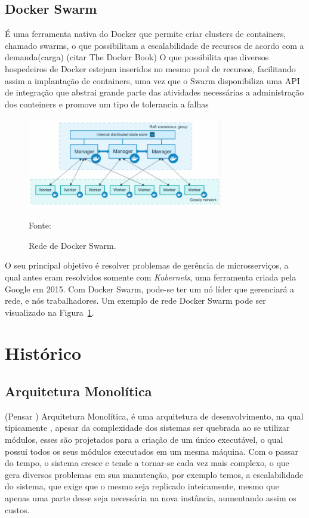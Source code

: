 \subsection{Docker Swarm}

É uma ferramenta nativa do Docker que permite criar clusters de containers, chamado swarms, o que possibilitam a escalabilidade de recursos de acordo com a demanda(carga) (citar The Docker Book)
O que possibilita que diversos hospedeiros de Docker estejam inseridos no mesmo pool de recursos, facilitando assim a implantação de containers, uma vez que o Swarm disponibiliza uma API de integração que abstrai grande parte das
atividades necessárias a administração dos conteiners e promove um tipo de tolerancia a falhas


\begin{figure}[htb!]
\caption{Rede de Docker Swarm.}
\label{fig:docker_swarm}
\includegraphics[height=4cm]{img/cap2/docker_swarm.png}
\centering

Fonte:~\cite{container}
\end{figure}


O seu principal objetivo é resolver problemas de gerência de microsserviços, a qual antes eram resolvidos somente com \textit{Kubernets}, uma ferramenta criada pela Google em 2015.
%
Com Docker Swarm, pode-se ter um nó líder que gerenciará a rede, e nós trabalhadores.
%
Um exemplo de rede Docker Swarm pode ser visualizado na Figura~\ref{fig:docker_swarm}.

\section{Histórico}

\subsection{Arquitetura Monolítica}

(Pensar ) Arquitetura Monolítica, é uma arquitetura de desenvolvimento, na qual típicamente , apesar da complexidade dos sistemas ser quebrada ao se utilizar módulos, esses são projetados para a criação de um único executável, o qual possui todos os seus módulos executados em um mesma máquina.
Com o passar do tempo, o sistema cresce e tende a tornar-se cada vez mais complexo, o que gera diversos problemas em sua manutenção, por exemplo temos, a escalabilidade do sistema, que exige que o mesmo seja replicado inteiramente, mesmo que apenas uma parte desse seja necessária na nova instância, aumentando assim os custos.

